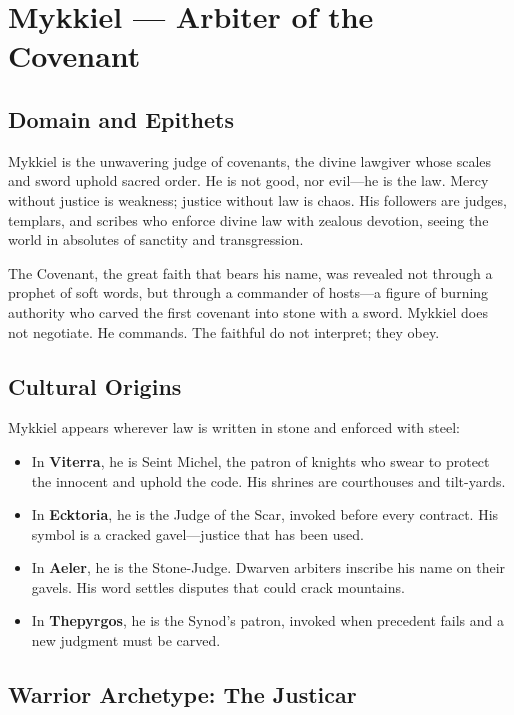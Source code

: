 \section{Mykkiel — Arbiter of the Covenant}

\subsection{Domain and Epithets}

Mykkiel is the unwavering judge of covenants, the divine lawgiver whose scales and sword uphold sacred order. He is not good, nor evil—he is the law. Mercy without justice is weakness; justice without law is chaos. His followers are judges, templars, and scribes who enforce divine law with zealous devotion, seeing the world in absolutes of sanctity and transgression.

The Covenant, the great faith that bears his name, was revealed not through a prophet of soft words, but through a commander of hosts—a figure of burning authority who carved the first covenant into stone with a sword. Mykkiel does not negotiate. He commands. The faithful do not interpret; they obey.

\subsection{Cultural Origins}

Mykkiel appears wherever law is written in stone and enforced with steel:

\begin{itemize}
\item In \textbf{Viterra}, he is Seint Michel, the patron of knights who swear to protect the innocent and uphold the code. His shrines are courthouses and tilt-yards.
\item In \textbf{Ecktoria}, he is the Judge of the Scar, invoked before every contract. His symbol is a cracked gavel—justice that has been used.
\item In \textbf{Aeler}, he is the Stone-Judge. Dwarven arbiters inscribe his name on their gavels. His word settles disputes that could crack mountains.
\item In \textbf{Thepyrgos}, he is the Synod's patron, invoked when precedent fails and a new judgment must be carved.
\end{itemize}

\subsection{Warrior Archetype: The Justicar}

